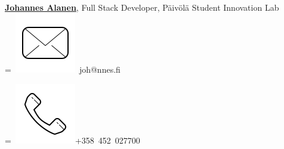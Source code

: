 \documentclass[]{plushcv}
\begin{document}
\begin{minipage}[t]{0.25\textwidth}
{}
\parbox{\wd0}{}\endgroup
\\
\sectionsep
\href{https://www.linkedin.com/in/johannes-alanen}{\textbf{Johannes Alanen}}, Full Stack Developer, Päivölä Student Innovation Lab 
\\
\begingroup
{}=\hbox{
\includegraphics[scale=0.1,trim={0 1cm 0cm 0cm}]{icons/main/mail.png}\hspace{0.3cm} joh@nnes.fi
}
\parbox{\wd0}{}
\endgroup
\begingroup
{}=\hbox{
\includegraphics[scale=0.1,trim={0 1.25cm -0.4cm 0cm}]{icons/main/phone.png}\hspace{0.3cm}+358 452 027700
}
\parbox{\wd0}{}\endgroup
\\






\end{minipage} 
\end{document}
